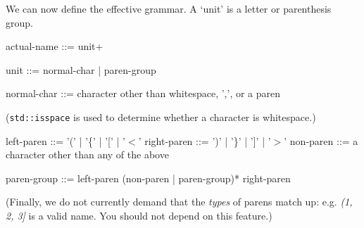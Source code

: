 We can now define the effective grammar. A `unit' is a letter or
parenthesis group.

  actual-name  ::=  unit+

  unit  ::=  normal-char  |  paren-group

  normal-char ::=  character other than whitespace, ',', or a paren

(\texttt{std::isspace} is used to determine whether a character is
  whitespace.)

  left-paren   ::=  '(' | '\{' | '[' | '$<$'
  right-paren  ::=  ')' | '\}' | ']' | '$>$'
  non-paren  ::=  a character other than any of the above

  paren-group ::=  left-paren  (non-paren | paren-group)*  right-paren

(Finally, we do not currently demand that the \textsl{types} of parens
  match up: e.g. \textsl{(1, 2, 3]} is a valid name. You should not
    depend on this feature.)
